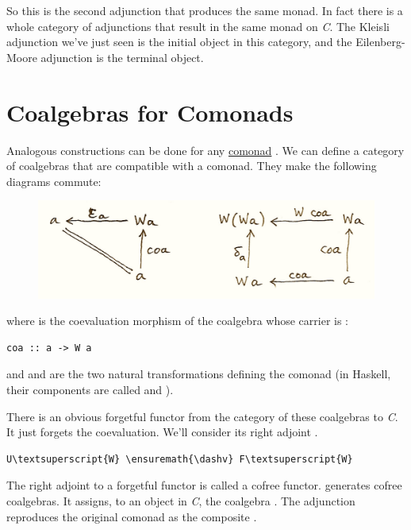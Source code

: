 So this is the second adjunction that produces the same monad. In fact
there is a whole category of adjunctions  that result
in the same monad  on \emph{C}. The Kleisli adjunction we've
just seen is the initial object in this category, and the
Eilenberg-Moore adjunction is the terminal object.

\section{Coalgebras for Comonads}\label{coalgebras-for-comonads}

Analogous constructions can be done for any
\hyperref[comonads]{comonad}
. We can define a category of coalgebras that are compatible
with a comonad. They make the following diagrams commute:

\begin{figure}[H]
\centering
\includegraphics[width=\textwidth]{images/talg5.png}
\end{figure}

\noindent
where  is the coevaluation morphism of the coalgebra whose
carrier is :

\begin{Verbatim}[commandchars=\\\{\}]
coa :: a -> W a
\end{Verbatim}
and  and  are the two natural transformations
defining the comonad (in Haskell, their components are called
 and ).

There is an obvious forgetful functor  from the category of
these coalgebras to \emph{C}. It just forgets the coevaluation. We'll
consider its right adjoint .

\begin{Verbatim}[commandchars=\\\{\}]
U\textsuperscript{W} \ensuremath{\dashv} F\textsuperscript{W}
\end{Verbatim}
The right adjoint to a forgetful functor is called a cofree functor.
 generates cofree coalgebras. It assigns, to an object
 in \emph{C}, the coalgebra . The
adjunction reproduces the original comonad as the composite
.

